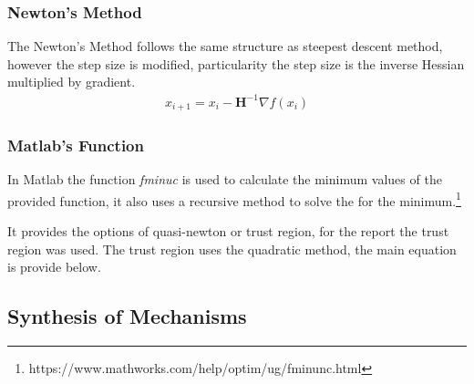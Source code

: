 \documentclass[12pt]{article}
\begin{document}
\subsubsection{Newton's Method}
The Newton’s Method follows the same structure as steepest descent method, however the step size is modified, particularity  the step size is the inverse Hessian multiplied by gradient.
\begin{align}
    x_{i+1}=x_i-\textbf{H}^{-1}\nabla f(x_i)
\end{align}

\subsubsection{Matlab's Function}
In Matlab the function \textit{fminuc} is used to calculate the minimum values of the provided function, it also uses a recursive method to solve the for the minimum.\footnote{https://www.mathworks.com/help/optim/ug/fminunc.html}

It provides the options of quasi-newton or trust region, for the report the trust region was used. 
The trust region uses the quadratic method, the main equation is provide below. 
\pagebreak
\subsection{Synthesis of Mechanisms}
\end{document}

